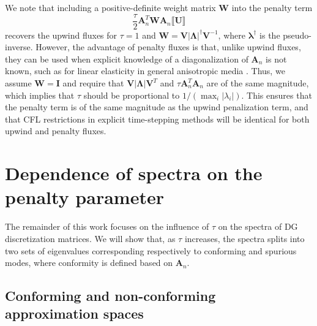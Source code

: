\documentclass[preprint,10pt]{elsarticle}
\newcommand{\LRp}[1]{\left( #1 \right)}
\newcommand{\LRb}[1]{\left| #1 \right|}
\newcommand{\jump}[1] {\ensuremath{\llbracket#1\rrbracket}}
\begin{document}
We note that including a positive-definite weight matrix $\bm{W}$ into the penalty term
\[
\frac{\tau}{2} \bm{A}_n^T \bm{W}\bm{A}_n\jump{\bm{U}}
\]
recovers the upwind fluxes for $\tau = 1$ and $\bm{W} = \bm{V}\LRb{\bm{\Lambda}}^{\dagger}\bm{V}^{-1}$, where $\bm{\lambda}^{\dagger}$ is the pseudo-inverse.  However, the advantage of penalty fluxes is that, unlike upwind fluxes, they can be used when explicit knowledge of a diagonalization of $\bm{A}_n$ is not known, such as for linear elasticity in general anisotropic media \cite{ye2016discontinuous}.  Thus, we assume $\bm{W} = \bm{I}$ and require that $\bm{V}\LRb{\bm{\Lambda}}\bm{V}^T$ and $\tau\bm{A}_n^T\bm{A}_n$ are of the same magnitude, which implies that $\tau$ should be proportional to $1/\LRp{\max_i\LRb{\lambda_i}}$.  This ensures that the penalty term is of the same magnitude as the upwind penalization term, and that CFL restrictions in explicit time-stepping methods will be identical for both upwind and penalty fluxes.  

\section{Dependence of spectra on the penalty parameter}

The remainder of this work focuses on the influence of $\tau$ on the spectra of DG discretization matrices.  We will show that, as $\tau$ increases, the spectra splits into two sets of eigenvalues corresponding respectively to conforming and spurious modes, where conformity is defined based on $\bm{A}_n$.  

\subsection{Conforming and non-conforming approximation spaces}
\end{document}
